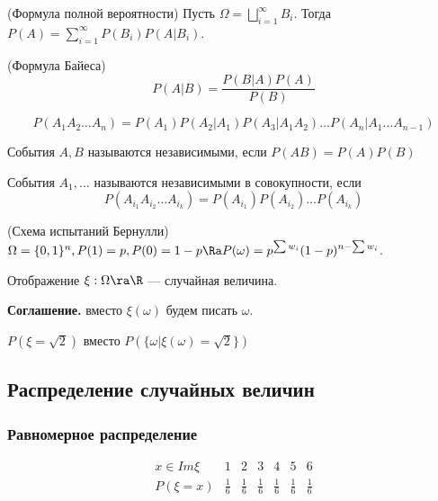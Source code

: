 \begin{definition}(Формула полной вероятности)
    Пусть \(\Omega = \bigsqcup_{i = 1}^\infty B_i\). Тогда \(P(A) = \sum_{i = 1}^\infty P(B_i)P(A | B_i)\).
\end{definition}

\begin{definition}(Формула Байеса)
    \[P(A | B) = \frac{P(B | A)P(A)}{P(B)}\]
\end{definition}

\begin{note}
    \[P(A_1A_2 \dots A_n) = P(A_1)P(A_2 | A_1)P(A_3 | A_1A_2)\dots P(A_n|A_1\dots A_{n - 1})\]
\end{note}

\begin{definition}
    События \(A, B\) называются независимыми, если \(P(AB) = P(A)P(B)\)
\end{definition}

\begin{definition}
    События \(A_1, \dots\) называются независимыми в совокупности, если 
    \[P(A_{i_1}A_{i_2}\dots A_{i_k}) = P(A_{i_1})P(A_{i_2})\dots P(A_{i_k})\]
\end{definition}

\begin{definition}(Схема испытаний Бернулли)
    \(\Omega = \{0, 1\}^n, P(1) = p, P(0) = 1 - p \Ra P(\omega) = p^{\sum w_i}(1 - p)^{n - \sum w_i}\).
\end{definition}

\begin{definition}
    Отображение \(\xi: \Omega \ra \R\) --- случайная величина.
\end{definition}

\noindent\textbf{Соглашение.} вместо \(\xi(\omega)\) будем писать \(\omega\).

\begin{example}
    \(P(\xi = \sqrt{2})\) вместо \(P(\{\omega | \xi(\omega) = \sqrt{2}\})\)
\end{example}

\subsection{Распределение случайных величин}
\subsubsection{Равномерное распределение}
\[\begin{array}{c|cccccc}
    x \in Im\xi & 1 & 2 & 3 & 4 & 5 & 6 \\
    \hline
    P(\xi = x) & \frac{1}{6} & \frac{1}{6} & \frac{1}{6} & \frac{1}{6} & \frac{1}{6} & \frac{1}{6} \\
\end{array}\]

